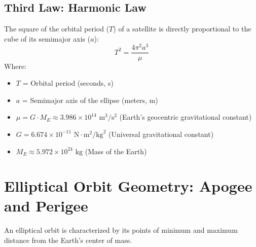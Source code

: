 \documentclass[12pt,a4paper]{article}
\begin{document}
\subsection{Third Law: Harmonic Law}
The square of the orbital period ($T$) of a satellite is directly proportional to the cube of its semimajor axis ($a$):
\begin{equation}
  T^2 = \frac{4\pi^2 a^3}{\mu}
\end{equation}
Where:
\begin{itemize}[leftmargin=*, label=$\bullet$, noitemsep]
  \item $T$ = Orbital period (seconds, s)
  \item $a$ = Semimajor axis of the ellipse (meters, m)
  \item $\mu = G \cdot M_E \approx 3.986 \times 10^{14} \text{ m}^3/\text{s}^2$ (Earth's geocentric gravitational constant)
  \item $G = 6.674 \times 10^{-11} \text{ N}\cdot\text{m}^2/\text{kg}^2$ (Universal gravitational constant)
  \item $M_E \approx 5.972 \times 10^{24} \text{ kg}$ (Mass of the Earth)
\end{itemize}

\section{Elliptical Orbit Geometry: Apogee and Perigee}

An elliptical orbit is characterized by its points of minimum and maximum distance from the Earth's center of mass.
\end{document}
